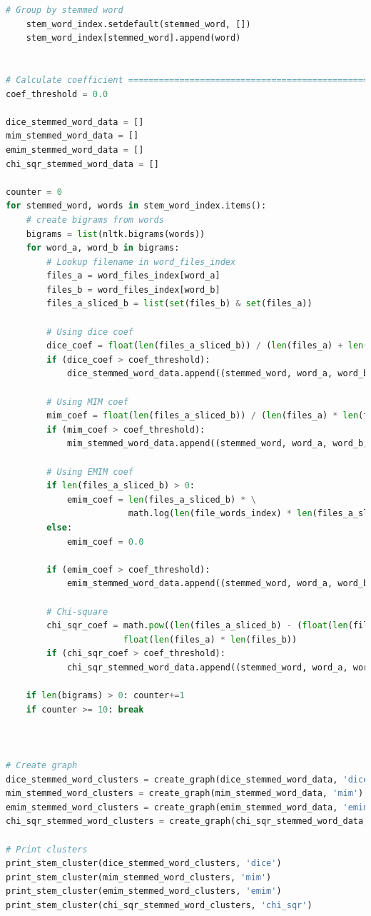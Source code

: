 \documentclass[letterpaper,11pt]{article}
\begin{document}
\begin{lstlisting}[language=python, caption={Python code for MLN1}, label={lst:mln1}]
    # Group by stemmed word
    stem_word_index.setdefault(stemmed_word, [])
    stem_word_index[stemmed_word].append(word)


# Calculate coefficient ==================================================================================
coef_threshold = 0.0

dice_stemmed_word_data = []
mim_stemmed_word_data = []
emim_stemmed_word_data = []
chi_sqr_stemmed_word_data = []

counter = 0
for stemmed_word, words in stem_word_index.items():
    # create bigrams from words
    bigrams = list(nltk.bigrams(words))
    for word_a, word_b in bigrams:
        # Lookup filename in word_files_index
        files_a = word_files_index[word_a]
        files_b = word_files_index[word_b]
        files_a_sliced_b = list(set(files_b) & set(files_a))

        # Using dice coef
        dice_coef = float(len(files_a_sliced_b)) / (len(files_a) + len(files_b))
        if (dice_coef > coef_threshold):
            dice_stemmed_word_data.append((stemmed_word, word_a, word_b, dice_coef))

        # Using MIM coef
        mim_coef = float(len(files_a_sliced_b)) / (len(files_a) * len(files_b))
        if (mim_coef > coef_threshold):
            mim_stemmed_word_data.append((stemmed_word, word_a, word_b, mim_coef))

        # Using EMIM coef
        if len(files_a_sliced_b) > 0:
            emim_coef = len(files_a_sliced_b) * \
                        math.log(len(file_words_index) * len(files_a_sliced_b) / float(len(files_a) * len(files_b)))
        else:
            emim_coef = 0.0

        if (emim_coef > coef_threshold):
            emim_stemmed_word_data.append((stemmed_word, word_a, word_b, emim_coef))

        # Chi-square
        chi_sqr_coef = math.pow((len(files_a_sliced_b) - (float(len(files_a) * len(files_b)) / len(file_words_index))), 2) / \
                       float(len(files_a) * len(files_b))
        if (chi_sqr_coef > coef_threshold):
            chi_sqr_stemmed_word_data.append((stemmed_word, word_a, word_b, chi_sqr_coef))

    if len(bigrams) > 0: counter+=1
    if counter >= 10: break



# Create graph
dice_stemmed_word_clusters = create_graph(dice_stemmed_word_data, 'dice')
mim_stemmed_word_clusters = create_graph(mim_stemmed_word_data, 'mim')
emim_stemmed_word_clusters = create_graph(emim_stemmed_word_data, 'emim')
chi_sqr_stemmed_word_clusters = create_graph(chi_sqr_stemmed_word_data, 'chi_sqr')

# Print clusters
print_stem_cluster(dice_stemmed_word_clusters, 'dice')
print_stem_cluster(mim_stemmed_word_clusters, 'mim')
print_stem_cluster(emim_stemmed_word_clusters, 'emim')
print_stem_cluster(chi_sqr_stemmed_word_clusters, 'chi_sqr')

\end{lstlisting}
\end{document}
